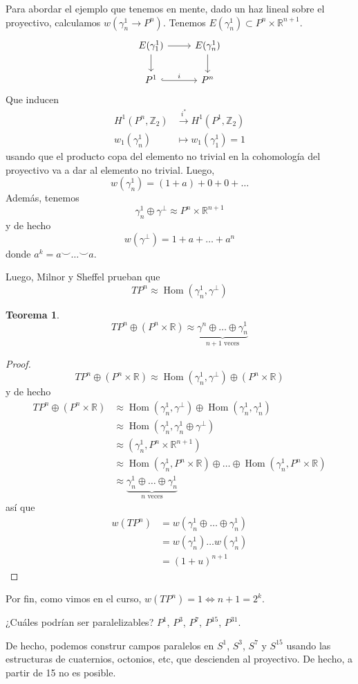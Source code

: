 \documentclass[spanish]{book}
\theoremstyle{definition}
\newtheorem*{teo}{Teorema}
\newcommand{\R}{\mathbb{R}}
\newcommand{\Z}{\mathbb{Z}}
\DeclareMathOperator{\Hom}{Hom}
\begin{document}
Para abordar el ejemplo que tenemos en mente, dado un haz lineal sobre el proyectivo, calculamos $w(\gamma^1_n\to P^n)$. Tenemos $E(\gamma^1_n)\subset P^n\times\R^{n+1}$.
\[\begin{tikzcd}
	E(\gamma^1_1)\arrow[r]\arrow[d]&E(\gamma^1_n)\arrow[d]\\
	P^1\arrow[r,hook,"i"]&P^n
\end{tikzcd}\]
Que inducen
\begin{align*}
	H^1(P^n,\Z_2)&\overset{i^*}{\to}H^1(P^1,\Z_2)\\
	w_1(\gamma^1_n)&\mapsto w_1(\gamma^1_1)=1
\end{align*}
usando que el producto copa del elemento no trivial en la cohomología del proyectivo va a dar al elemento no trivial. Luego,
\[w(\gamma^1_n)=(1+a)+0+0+\ldots\]
Además, tenemos
\[\gamma^1_n\oplus\gamma^\perp\approx P^n\times\R^{n+1}\]
y de hecho
\[w(\gamma^\perp)=1+a+\ldots+a^n\]
donde $a^k=a\smile\ldots\smile a$.

Luego, Milnor y Sheffel prueban que
\[TP^n\approx \Hom(\gamma^1_n,\gamma^\perp)\]

\begin{teo}
	\[TP^n\oplus(P^n\times\R)\approx\underbrace{\gamma^n\oplus\ldots\oplus\gamma^1_n}_{n+1\text{ veces}}\]
\end{teo}
\begin{proof}
	\[TP^n\oplus(P^n\times\R)\approx\Hom(\gamma^1_n,\gamma^\perp)\oplus (P^n\times\R)\]
	y de hecho
	\begin{align*}TP^n\oplus(P^n\times\R)&\approx\Hom(\gamma^1_n,\gamma^\perp)\oplus\Hom(\gamma^1_n,\gamma^1_n)\\
		&\approx\Hom(\gamma^1_n,\gamma^1_n\oplus\gamma^\perp)\\
		&\approx(\gamma^1_n,P^n\times\R^{n+1})\\
		&\approx\Hom(\gamma^1_n,P^n\times\R)\oplus\ldots\oplus\Hom(\gamma^1_n,P^n\times\R)\\
		&\approx\underbrace{\gamma^1_n\oplus\ldots\oplus\gamma^1_n}_{n\text{ veces}}
	\end{align*}
	así que 
	\begin{align*}
		w(TP^n)&= w(\gamma^1_n\oplus\ldots\oplus\gamma^1_n)\\
		&=w(\gamma^1_n)\ldots w(\gamma^1_n)\\
		&=(1+u)^{n+1}
	\end{align*}
\end{proof}
Por fin, como vimos en el curso, $w(TP^n)=1\iff n+1=2^k$.

¿Cuáles podrían ser paralelizables? $P^1$, $P^3$, $P^7$, $P^{15}$, $P^{31}$.

De hecho, podemos construr campos paralelos en $S^1$, $S^3$, $S^7$ y $S^{15}$ usando las estructuras de cuaternios, octonios, etc, que descienden al proyectivo. De hecho, a partir de 15 no es posible.
\end{document}
